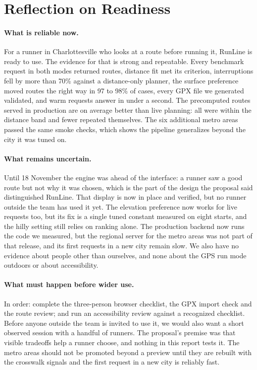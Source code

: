\section{Reflection on Readiness}
\label{sec:readiness}

\paragraph{What is reliable now.}
For a runner in Charlottesville who looks at a route before running it,
RunLine is ready to use. The evidence for that is strong and repeatable. Every
benchmark request in both modes returned routes, distance fit met its
criterion, interruptions fell by more than 70\% against a distance-only
planner, the surface preference moved routes the right way in 97 to 98\% of
cases, every GPX file we generated validated, and warm requests answer in
under a second. The precomputed routes served in production are on average
better than live planning: all were within the distance band and fewer
repeated themselves. The six additional metro areas passed the same smoke
checks, which shows the pipeline generalizes beyond the city it was tuned on.

\paragraph{What remains uncertain.}
Until 18 November the engine was ahead of the interface: a runner saw a good
route but not why it was chosen, which is the part of the design the proposal
said distinguished RunLine. That display is now in place and verified, but no
runner outside the team has used it yet. The elevation preference now works
for live requests too, but its fix is a single tuned constant measured on
eight starts, and the hilly setting still relies on ranking alone. The
production backend now runs the code we measured, but the regional server for
the metro areas was not part of that release, and its first requests in a new
city remain slow. We also have no evidence about
people other than ourselves, and none about the GPS run mode outdoors or about
accessibility.

\paragraph{What must happen before wider use.}
In order: complete the three-person browser checklist, the GPX import check and the route review;
and run an accessibility review against a
recognized checklist. Before anyone outside the team is invited to use it, we
would also want a short observed session with a handful of runners. The
proposal's premise was that visible tradeoffs help a runner choose, and
nothing in this report tests it. The metro
areas should not be promoted beyond a preview until they are rebuilt with the
crosswalk signals and the first request in a new city is reliably fast.

